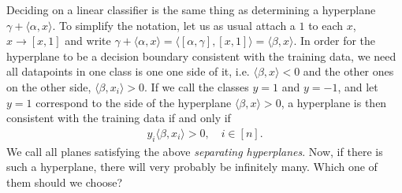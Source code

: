 \documentclass{article}
\newcommand{\sprod}[1]{\langle #1 \rangle}
\begin{document}
Deciding on a linear classifier is the same thing as determining a hyperplane $\gamma + \sprod{\alpha,x}$.  To simplify the notation, let us as usual attach a $1$ to each $x$, $x\to [x,1]$ and write $\gamma + \sprod{\alpha,x} = \sprod{[\alpha,\gamma],[x,1]}=\sprod{\beta,x}$. In order for the hyperplane to be a  decision boundary consistent with the training data, we need all datapoints in one class is one one side of it, i.e. $\sprod{\beta,x}<0$ and the other ones on the other side, $\sprod{\beta,x_i}>0$. If we call the classes $y=1$ and $y=-1$, and let $y=1$ correspond to the side of the hyperplane $\sprod{\beta,x}>0$, a hyperplane is then consistent with the training data if and only if
\begin{align*}
    y_i \sprod{\beta,x_i}>0, \quad i \in [n].
\end{align*}
We call all planes satisfying the above \emph{separating hyperplanes}. Now, if there is such a hyperplane, there will very probably be infinitely many. Which one of them should we choose?
\end{document}
